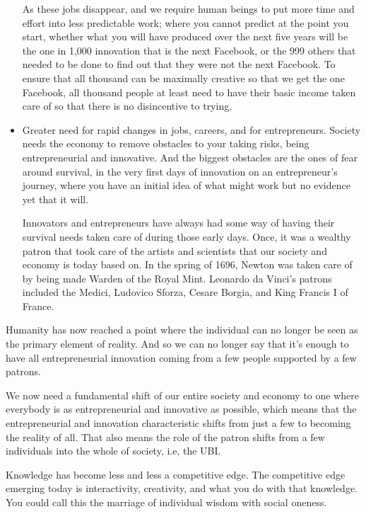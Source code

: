 \begin{itemize}
As these jobs disappear, and we require human beings to put more time and effort into less predictable work; where you cannot predict at the point you start, whether what you will have produced over the next five years will be the one in 1,000 innovation that is the next Facebook, or the 999 others that needed to be done to find out that they were not the next Facebook. To ensure that all thousand can be maximally creative so that we get the one Facebook, all thousand people at least need to have their basic income taken care of so that there is no disincentive to trying.


\item Greater need for rapid changes in jobs, careers, and for entrepreneurs. Society needs the economy to remove obstacles to your taking risks, being entrepreneurial and innovative. And the biggest obstacles are the ones of fear around survival, in the very first days of innovation on an entrepreneur’s journey, where you have an initial idea of what might work but no evidence yet that it will. 


Innovators and entrepreneurs have always had some way of having their survival needs taken care of during those early days. Once, it was a wealthy patron that took care of the artists and scientists that our society and economy is today based on. In the spring of 1696, Newton was taken care of by being made Warden of the Royal Mint. Leonardo da Vinci’s patrons included the Medici, Ludovico Sforza, Cesare Borgia, and King Francis I of France.
\end{itemize}


Humanity has now reached a point where the individual can no longer be seen as the primary element of reality. And so we can no longer say that it's enough to have all entrepreneurial innovation coming from a few people supported by a few patrons.


We now need a fundamental shift of our entire society and economy to one where everybody is as entrepreneurial and innovative as possible, which means that the entrepreneurial and innovation characteristic shifts from just a few to becoming the reality of all. That also means the role of the patron shifts from a few individuals into the whole of society, i.e, the UBI.


Knowledge has become less and less a competitive edge. The competitive edge emerging today is interactivity, creativity, and what you do with that knowledge. You could call this the marriage of individual wisdom with social oneness.


